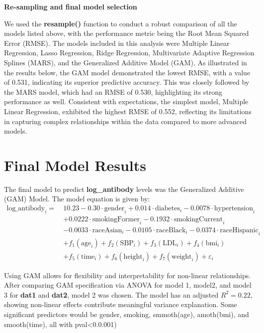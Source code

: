 \documentclass[
]{article}
\begin{document}
\textbf{Re-sampling and final model selection}

We used the \textbf{resample()} function to conduct a robust comparison
of all the models listed above, with the performance metric being the
Root Mean Squared Error (RMSE). The models included in this analysis
were Multiple Linear Regression, Lasso Regression, Ridge Regression,
Multivariate Adaptive Regression Splines (MARS), and the Generalized
Additive Model (GAM). As illustrated in the results below, the GAM model
demonstrated the lowest RMSE, with a value of 0.531, indicating its
superior predictive accuracy. This was closely followed by the MARS
model, which had an RMSE of 0.530, highlighting its strong performance
as well. Consistent with expectations, the simplest model, Multiple
Linear Regression, exhibited the highest RMSE of 0.552, reflecting its
limitations in capturing complex relationships within the data compared
to more advanced models.

\section{Final Model Results}\label{final-model-results}

The final model to predict \textbf{log\_antibody} levels was the
Generalized Additive (GAM) Model. The model equation is given by: \[
\begin{aligned}
\text{log_antibody}_i =\ & 
\mathbf{10.23} 
- \mathbf{0.30} \cdot \text{gender}_i 
+ \mathbf{0.014} \cdot \text{diabetes}_i 
- \mathbf{0.0078} \cdot \text{hypertension}_i \\
& + \mathbf{0.0222} \cdot \text{smokingFormer}_i 
- \mathbf{0.1932} \cdot \text{smokingCurrent}_i \\
& - \mathbf{0.0033} \cdot \text{raceAsian}_i 
- \mathbf{0.0105} \cdot \text{raceBlack}_i 
- \mathbf{0.0374} \cdot \text{raceHispanic}_i \\
& + f_1(\text{age}_i) 
+ f_2(\text{SBP}_i) 
+ f_3(\text{LDL}_i) 
+ f_4(\text{bmi}_i) \\
& + f_5(\text{time}_i) 
+ f_6(\text{height}_i) 
+ f_7(\text{weight}_i) 
+ \varepsilon_i
\end{aligned}
\]

Using GAM allows for flexibility and interpretability for non-linear
relationships. After comparing GAM specification via ANOVA for model 1,
model2, and model 3 for \textbf{dat1} and \textbf{dat2}, model 2 was
chosen. The model has an adjusted \(R^2 = 0.22\), showing non-linear
effects contribute meaningful variance explanation. Some significant
predictors would be gender, smoking, smmoth(age), amoth(bmi), and
smooth(time), all with pval\textless0.0.001)
\end{document}
